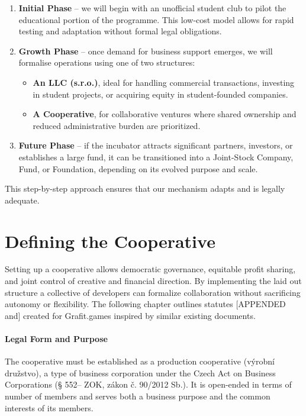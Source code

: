 \begin{enumerate}
    \item \textbf{Initial Phase} – we will begin with an unofficial student club to pilot the educational portion of the programme. This low-cost model allows for rapid testing and adaptation without formal legal obligations.
    \item \textbf{Growth Phase} – once demand for business support emerges, we will formalise operations using one of two structures:
    \begin{itemize}
        \item \textbf{An LLC (s.r.o.)}, ideal for handling commercial transactions, investing in student projects, or acquiring equity in student-founded companies.
        \item \textbf{A Cooperative}, for collaborative ventures where shared ownership and reduced administrative burden are prioritized.
    \end{itemize}
    \item \textbf{Future Phase} – if the incubator attracts significant partners, investors, or establishes a large fund, it can be transitioned into a Joint-Stock Company, Fund, or Foundation, depending on its evolved purpose and scale.
\end{enumerate}

This step-by-step approach ensures that our mechanism adapts and is legally adequate.


\section{Defining the Cooperative}
Setting up a cooperative allows democratic governance, equitable profit sharing, and joint control of creative and financial direction. By implementing the laid out structure a collective of developers can formalize collaboration without sacrificing autonomy or flexibility. The following chapter outlines statutes [APPENDED and] created for Grafit.games inspired by similar existing documents.
\paragraph{Legal Form and Purpose}
The cooperative must be established as a production cooperative (výrobní družstvo), a type of business corporation under the Czech Act on Business Corporations (§ 552– ZOK, zákon č. 90/2012 Sb.). It is open-ended in terms of number of members and serves both a business purpose and the common interests of its members.

